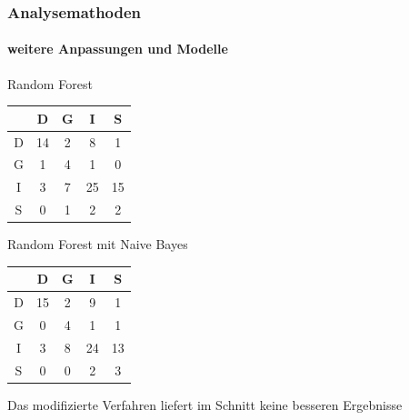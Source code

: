 \documentclass{beamer}
\begin{document}
\begin{frame}
 \frametitle{Analysemathoden}
 \framesubtitle{weitere Anpassungen und Modelle}
 
 \begin{minipage}{0.45\textwidth}
  
 Random Forest\\
 \begin{center}
 \begin{tabular}{c|c|c|c|c|}
                &  D     & G  & I     & S\\
  \hline
  D      & 14            & 2             & 8             & 1 \\
  G  & 1             & 4             & 1             & 0\\
  I     & 3             & 7             & 25            & 15\\
  S        & 0             & 1             & 2             & 2
 \end{tabular}
 \end{center}
 \end{minipage}
 \begin{minipage}{0.45\textwidth}
 Random Forest mit Naive Bayes\\
 \begin{center}
  \begin{tabular}{c|c|c|c|c|}
      &  D    & G   & I     & S\\
  \hline
  D   & 15    & 2   & 9             & 1 \\
  G   & 0     & 4   & 1             & 1\\
  I   & 3     & 8   & 24            & 13\\
  S   & 0     & 0   & 2             & 3
 \end{tabular}
 \end{center}
 \end{minipage}
 
  \vspace{12pt}
 Das modifizierte Verfahren liefert im Schnitt keine besseren Ergebnisse
\end{frame}

\end{document}
